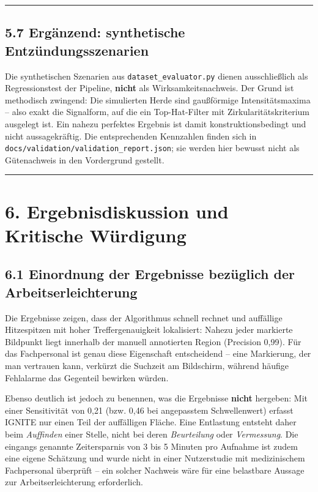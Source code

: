 \documentclass[
  11pt,
]{article}
\begin{document}
\begin{center}\rule{0.5\linewidth}{0.5pt}\end{center}

\subsection{5.7 Ergänzend: synthetische
Entzündungsszenarien}\label{erguxe4nzend-synthetische-entzuxfcndungsszenarien}

Die synthetischen Szenarien aus \texttt{dataset\_evaluator.py} dienen
ausschließlich als Regressionstest der Pipeline, \textbf{nicht} als
Wirksamkeitsnachweis. Der Grund ist methodisch zwingend: Die simulierten
Herde sind gaußförmige Intensitätsmaxima -- also exakt die Signalform,
auf die ein Top-Hat-Filter mit Zirkularitätskriterium ausgelegt ist. Ein
nahezu perfektes Ergebnis ist damit konstruktionsbedingt und nicht
aussagekräftig. Die entsprechenden Kennzahlen finden sich in
\texttt{docs/validation/validation\_report.json}; sie werden hier
bewusst nicht als Gütenachweis in den Vordergrund gestellt.

\begin{center}\rule{0.5\linewidth}{0.5pt}\end{center}

\section{6. Ergebnisdiskussion und Kritische
Würdigung}\label{ergebnisdiskussion-und-kritische-wuxfcrdigung}

\subsection{6.1 Einordnung der Ergebnisse bezüglich der
Arbeitserleichterung}\label{einordnung-der-ergebnisse-bezuxfcglich-der-arbeitserleichterung}

Die Ergebnisse zeigen, dass der Algorithmus schnell rechnet und
auffällige Hitzespitzen mit hoher Treffergenauigkeit lokalisiert: Nahezu
jeder markierte Bildpunkt liegt innerhalb der manuell annotierten Region
(Precision 0,99). Für das Fachpersonal ist genau diese Eigenschaft
entscheidend -- eine Markierung, der man vertrauen kann, verkürzt die
Suchzeit am Bildschirm, während häufige Fehlalarme das Gegenteil
bewirken würden.

Ebenso deutlich ist jedoch zu benennen, was die Ergebnisse
\textbf{nicht} hergeben: Mit einer Sensitivität von 0,21 (bzw. 0,46 bei
angepasstem Schwellenwert) erfasst IGNITE nur einen Teil der auffälligen
Fläche. Eine Entlastung entsteht daher beim \emph{Auffinden} einer
Stelle, nicht bei deren \emph{Beurteilung} oder \emph{Vermessung}. Die
eingangs genannte Zeitersparnis von 3 bis 5 Minuten pro Aufnahme ist
zudem eine eigene Schätzung und wurde nicht in einer Nutzerstudie mit
medizinischem Fachpersonal überprüft -- ein solcher Nachweis wäre für
eine belastbare Aussage zur Arbeitserleichterung erforderlich.
\end{document}
